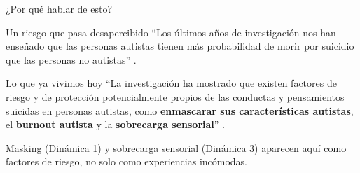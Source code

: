 \begin{frame}{¿Por qué hablar de esto?}
  \begin{block}{Un riesgo que pasa desapercibido}
    \small
    \enquote{Los últimos años de investigación nos han enseñado que las personas
    autistas tienen más probabilidad de morir por suicidio que las personas no
    autistas} \citep{conner2023}.
  \end{block}

  \begin{block}{Lo que ya vivimos hoy}
    \small
    \enquote{La investigación ha mostrado que existen factores de riesgo y de
    protección potencialmente propios de las conductas y pensamientos suicidas
    en personas autistas, como \textbf{enmascarar sus características autistas},
    el \textbf{burnout autista} y la \textbf{sobrecarga sensorial}}
    \citep{conner2023}.
  \end{block}

  {\footnotesize\color{gray!80}
  Masking (Dinámica 1) y sobrecarga sensorial (Dinámica 3) aparecen aquí como
  factores de riesgo, no solo como experiencias incómodas.\par}
\end{frame}

